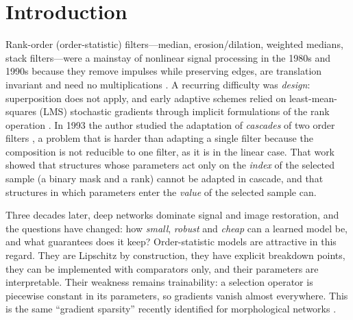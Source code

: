 \documentclass[11pt,a4paper]{article}
\theoremstyle{definition}
\theoremstyle{remark}
\let\svthefootnote\thefootnote
\begin{document}
\section{Introduction}
\let\thefootnote\relax{}\addtocounter{footnote}{0}\let\thefootnote\svthefootnote
Rank-order (order-statistic) filters---median, erosion/dilation, weighted medians, stack filters---were a mainstay of
nonlinear signal processing in the 1980s and 1990s because they remove impulses while preserving edges, are
translation invariant and need no multiplications \cite{pitas1990,wendt1986stack,yin1996}. A recurring difficulty was
\emph{design}: superposition does not apply, and early adaptive schemes relied on least-mean-squares (LMS) stochastic gradients through
implicit formulations of the rank operation \cite{salembier1992,pitas1991,ropert1994}. In 1993 the author studied the
adaptation of \emph{cascades} of two order filters \cite{delrio1993}, a problem that is harder than adapting a single
filter because the composition is not reducible to one filter, as it is in the linear case. That work showed that
structures whose parameters act only on the \emph{index} of the selected sample (a binary mask and a rank) cannot be
adapted in cascade, and that structures in which parameters enter the \emph{value} of the selected sample can.

Three decades later, deep networks dominate signal and image restoration, and the questions have changed: how
\emph{small}, \emph{robust} and \emph{cheap} can a learned model be, and what guarantees does it keep? Order-statistic
models are attractive in this regard. They are Lipschitz by construction, they have explicit breakdown points, they
can be implemented with comparators only, and their parameters are interpretable. Their weakness remains
trainability: a selection operator is piecewise constant in its parameters, so gradients vanish almost everywhere.
This is the same ``gradient sparsity'' recently identified for morphological networks \cite{dimitrova2026}.
\end{document}
